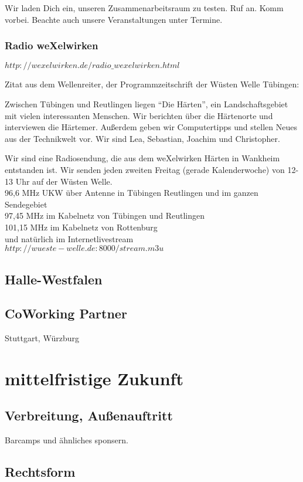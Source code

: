 Wir laden Dich ein, unseren Zusammenarbeitsraum zu testen.
%
Ruf an. Komm vorbei.
%
Beachte auch unsere Veranstaltungen unter Termine.
      \subsubsection{Radio weXelwirken}
      
$http://wexelwirken.de/radio\_wexelwirken.html$
      


Zitat aus dem Wellenreiter, der Programmzeitschrift der Wüsten Welle Tübingen:



Zwischen Tübingen und Reutlingen liegen "`Die Härten"', ein Landschaftsgebiet mit vielen interessanten Menschen.
%
Wir berichten über die Härtenorte und interviewen die Härtemer.
%
Außerdem geben wir Computertipps und stellen Neues aus der Technikwelt vor.
%
Wir sind Lea, Sebastian, Joachim und Christopher.



Wir sind eine Radiosendung, die aus dem weXelwirken Härten in Wankheim entstanden ist.
%
Wir senden jeden zweiten Freitag (gerade Kalenderwoche) von 12-13 Uhr auf der Wüsten Welle.\\
96,6 MHz UKW über Antenne in Tübingen Reutlingen und im ganzen Sendegebiet\\
97,45 MHz im Kabelnetz von Tübingen und Reutlingen\\
101,15 MHz im Kabelnetz von Rottenburg\\
und natürlich im Internetlivestream\\
$http://wueste-welle.de:8000/stream.m3u$
  \subsection{Halle-Westfalen}
  \subsection{CoWorking Partner}
  Stuttgart, Würzburg
  \section{mittelfristige Zukunft}
    \subsection{Verbreitung, Außenauftritt}
Barcamps und ähnliches sponsern.
    \subsection{Rechtsform}
